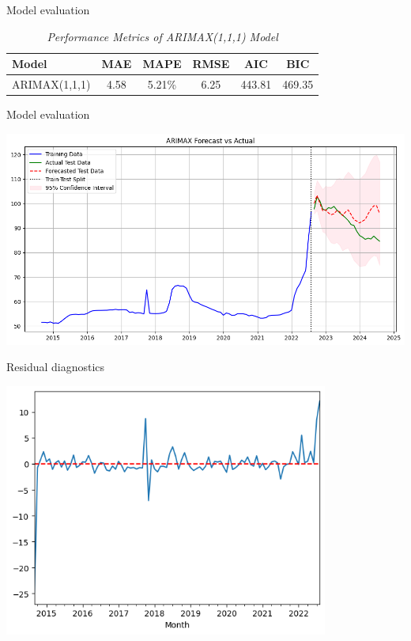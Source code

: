 \documentclass[12pt, aspectratio=169]{beamer}
\begin{document}
\begin{frame}{Model evaluation}
    \begin{table}
    \caption{\textit{Performance Metrics of ARIMAX(1,1,1) Model}}
    \label{arimax111}
    \centering
    \begin{tabular}{lccccc}
        \toprule
        Model & MAE & MAPE & RMSE & AIC & BIC \\
        \midrule
        ARIMAX(1,1,1) & 4.58 & 5.21\% & 6.25 & 443.81 & 469.35 \\
        \bottomrule
    \end{tabular}
\end{table}
\end{frame}

\begin{frame}{Model evaluation}
    \begin{center}
        \includegraphics[width = .9\textwidth]{train_test_forecast.png}
    \end{center}
\end{frame}

\begin{frame}{Residual diagnostics}
    \begin{center}
         \includegraphics[width = 0.8\textwidth,height = .9\textheight]{resid.png}
    \end{center}
\end{frame}
\end{document}
